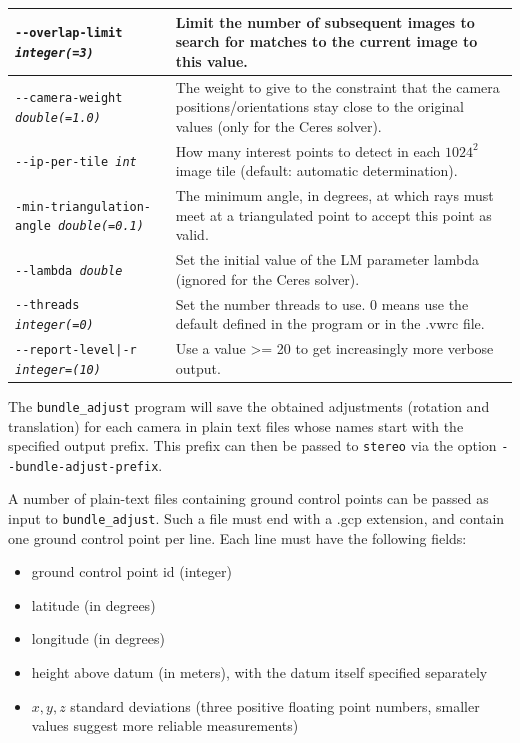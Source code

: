 \begin{longtable}{|l|p{7.5cm}|}
\texttt{-\/-overlap-limit \textit{integer(=3)}} & Limit the number of
subsequent images to search for matches to the current image to this
value.  \\ \hline

\texttt{-\/-camera-weight \textit{double(=1.0)}} &
The weight to give to the constraint that the
camera positions/orientations stay close to
the original values (only for the Ceres solver).
\\ \hline

\texttt{-\/-ip-per-tile \textit{int}} &
How many interest points to detect in each $1024^2$ image tile (default: automatic
determination).
\\ \hline

\texttt{-\/min-triangulation-angle \textit{double(=0.1)}} &
The minimum angle, in degrees, at which rays must meet at a triangulated point to accept this point as valid.
\\ \hline

\texttt{-\/-lambda \textit{double}} & Set the initial value of the LM parameter
lambda (ignored for the Ceres solver).\\ \hline

\texttt{-\/-threads \textit{integer(=0)}} & Set the number threads to use. 0 means use the default defined in the program or in the .vwrc file.\\ \hline

\texttt{-\/-report-level|-r \textit{integer=(10)}} & Use a value >= 20 to
get increasingly more verbose output. \\ \hline
\end{longtable}

The \texttt{bundle\_adjust} program will save the obtained adjustments
(rotation and translation) for each camera in plain text files whose
names start with the specified output prefix. This prefix can then be
passed to \texttt{stereo} via the option
\texttt{-\/-bundle-adjust-prefix}.

A number of plain-text files containing ground control points can be
passed as input to \texttt{bundle\_adjust}. Such a file must end with a
.gcp extension, and contain one ground control point per line. Each line
must have the following fields:
\begin{itemize}
\item ground control point id (integer)
\item latitude (in degrees)
\item longitude (in degrees)
\item height above datum (in meters), with the datum itself specified separately
\item $x, y, z$ standard deviations (three positive floating point
  numbers, smaller values suggest more reliable measurements)
\end{itemize}

